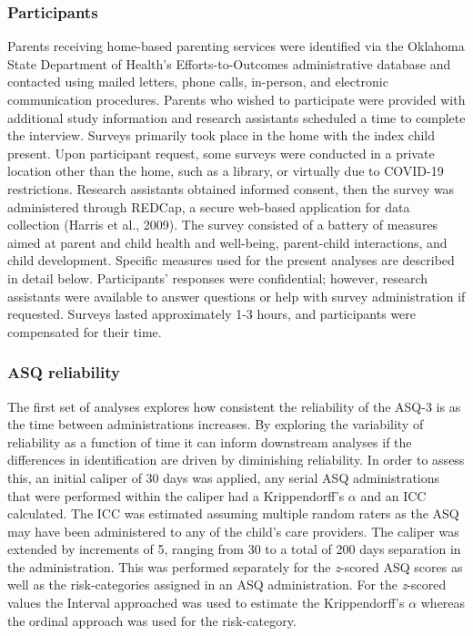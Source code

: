 \documentclass[
  11pt,
]{article}
\begin{document}
\hypertarget{participants}{%
\subsubsection{Participants}\label{participants}}

Parents receiving home-based parenting services were identified via the
Oklahoma State Department of Health's Efforts-to-Outcomes administrative
database and contacted using mailed letters, phone calls, in-person, and
electronic communication procedures. Parents who wished to participate
were provided with additional study information and research assistants
scheduled a time to complete the interview. Surveys primarily took place
in the home with the index child present. Upon participant request, some
surveys were conducted in a private location other than the home, such
as a library, or virtually due to COVID-19 restrictions. Research
assistants obtained informed consent, then the survey was administered
through REDCap, a secure web-based application for data collection
(Harris et al., 2009). The survey consisted of a battery of measures
aimed at parent and child health and well-being, parent-child
interactions, and child development. Specific measures used for the
present analyses are described in detail below. Participants' responses
were confidential; however, research assistants were available to answer
questions or help with survey administration if requested. Surveys
lasted approximately 1-3 hours, and participants were compensated for
their time.

\hypertarget{asq-reliability}{%
\subsubsection{ASQ reliability}\label{asq-reliability}}

The first set of analyses explores how consistent the reliability of the
ASQ-3 is as the time between administrations increases. By exploring the
variability of reliability as a function of time it can inform
downstream analyses if the differences in identification are driven by
diminishing reliability. In order to assess this, an initial caliper of
30 days was applied, any serial ASQ administrations that were performed
within the caliper had a Krippendorff's \(\alpha\) and an ICC
calculated. The ICC was estimated assuming multiple random raters as the
ASQ may have been administered to any of the child's care providers. The
caliper was extended by increments of 5, ranging from 30 to a total of
200 days separation in the administration. This was performed separately
for the \emph{z}-scored ASQ scores as well as the risk-categories
assigned in an ASQ administration. For the \emph{z}-scored values the
Interval approached was used to estimate the Krippendorff's \(\alpha\)
whereas the ordinal approach was used for the risk-category.
\end{document}
